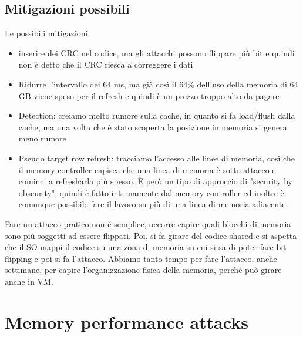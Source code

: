 \documentclass[12pt, oneside]{extbook} %
\begin{document}
\subsection{Mitigazioni possibili}
Le possibili mitigazioni
\begin{itemize}
\item inserire dei CRC nel codice, ma gli attacchi possono flippare più bit e quindi non è detto che il CRC riesca a correggere i dati
\item Ridurre l'intervallo dei 64 ms, ma già così il 64\% dell'uso della memoria di 64 GB viene speso per il refresh e quindi è un prezzo troppo alto da pagare
\item Detection: creiamo molto rumore sulla cache, in quanto si fa load/flush dalla cache, ma una volta che è stato scoperta la posizione in memoria si genera meno rumore
\item  Pseudo target row refresh: tracciamo l'accesso alle linee di memoria, così che il memory controller capisca che una linea di memoria è sotto attacco e cominci a refresharla più spesso. È però un tipo di approccio di "security by obscurity", quindi è fatto internamente dal memory controller ed inoltre è comunque possibile fare il lavoro su più di una linea di memoria adiacente.
\end{itemize}
Fare un attacco pratico non è semplice, occorre capire quali blocchi di memoria sono più soggetti ad essere flippati. Poi, si fa girare del codice shared e si aspetta che il SO mappi il codice su una zona di memoria su cui si sa di poter fare bit flipping e poi si fa l'attacco. Abbiamo tanto tempo per fare l'attacco, anche settimane, per capire l'organizzazione fisica della memoria, perché può girare anche in VM.
\section{Memory performance attacks}
\end{document}
